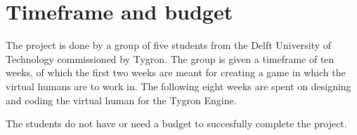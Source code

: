 \section{Timeframe and budget}
The project is done by a group of five students from the Delft University of Technology commissioned by Tygron. The group is given a timeframe of ten weeks, of which the first two weeks are meant for creating a game in which the virtual humans are to work in. The following eight weeks are spent on designing and coding the virtual human for the Tygron Engine.\newline

The students do not have or need a budget to succesfully complete the project. \newline
